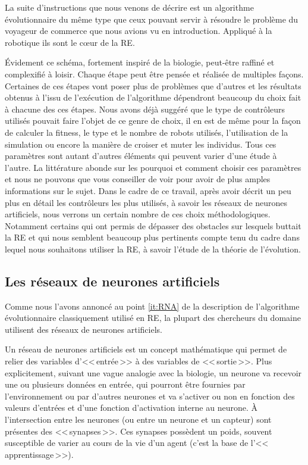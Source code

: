 La suite d'instructions que nous venons de décrire est un algorithme évolutionnaire du même type que ceux pouvant servir à résoudre le problème du voyageur de commerce que nous avions vu en introduction. Appliqué à la robotique ils sont le cœur de la RE.

Évidement ce schéma, fortement inspiré de la biologie, peut-être raffiné et complexifié à loisir. Chaque étape peut être pensée et réalisée de multiples façons. Certaines de ces étapes vont poser plus de problèmes que d'autres et les résultats obtenus à l'issu de l'exécution de l'algorithme dépendront beaucoup du choix fait à chacune des ces étapes. Nous avons déjà suggéré que le type de contrôleurs utilisés pouvait faire l'objet de ce genre de choix, il en est de même pour la façon de calculer la fitness, le type et le nombre de robots utilisés, l'utilisation de la simulation ou encore la manière de croiser et muter les individus. Tous ces paramètres sont autant d'autres éléments qui peuvent varier d'une étude à l'autre. La littérature abonde sur les pourquoi et comment choisir ces paramètres et nous ne pouvons que vous conseiller de voir \cite{nolfi00evolrobobiolintetechselfmach} pour avoir de plus amples informations sur le sujet. Dans le cadre de ce travail, après avoir décrit un peu plus en détail les contrôleurs les plus utilisés, à savoir les réseaux de neurones artificiels, nous verrons un certain nombre de ces choix méthodologiques. Notamment certains qui ont permis de dépasser des obstacles sur lesquels buttait la RE et qui nous semblent beaucoup plus pertinents compte tenu du cadre dans lequel nous souhaitons utiliser la RE, à savoir l'étude de la théorie de l'évolution.


\subsection{Les réseaux de neurones artificiels}\label{sec:RNA}
Comme nous l'avons annoncé au point \ref{it:RNA} de la description de l'algorithme évolutionnaire classiquement utilisé en RE, la plupart des chercheurs du domaine utilisent des réseaux de neurones artificiels.

Un réseau de neurones artificiels est un concept mathématique qui permet de relier des variables d'<<\,entrée\,>> à des variables de <<\,sortie\,>>. Plus explicitement, suivant une vague analogie avec la biologie, un neurone va recevoir une ou plusieurs données en entrée, qui pourront être fournies par l'environnement ou par d'autres neurones et va s'activer ou non en fonction des valeurs d'entrées et d'une fonction d'activation interne au neurone. À l'intersection entre les neurones (ou entre un neurone et un capteur) sont présentes des <<\,synapses\,>>. Ces synapses possèdent un poids, souvent susceptible de varier au cours de la vie d'un agent (c'est la base de l'<<\,apprentissage\,>>).

